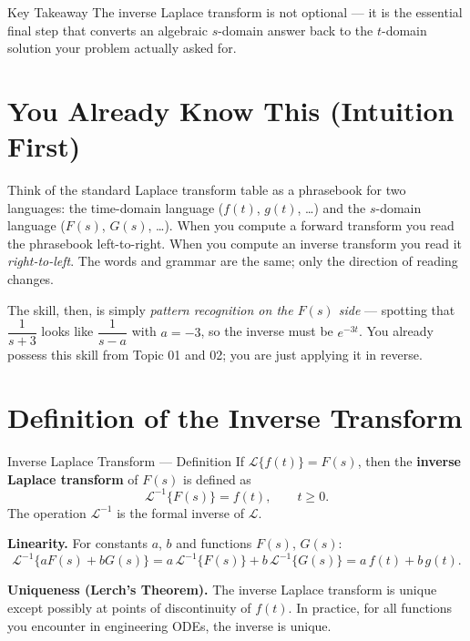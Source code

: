\documentclass[12pt,a4paper]{article}
\begin{document}
\begin{learnbox}{Key Takeaway}
The inverse Laplace transform is not optional --- it is the essential final step
that converts an algebraic $s$-domain answer back to the $t$-domain solution your
problem actually asked for.
\end{learnbox}

\section{You Already Know This (Intuition First)}

Think of the standard Laplace transform table as a phrasebook for two languages:
the time-domain language ($f(t)$, $g(t)$, \ldots) and the $s$-domain language
($F(s)$, $G(s)$, \ldots).  When you compute a forward transform you read the
phrasebook left-to-right.  When you compute an inverse transform you read it
\emph{right-to-left}.  The words and grammar are the same; only the direction
of reading changes.

The skill, then, is simply \emph{pattern recognition on the $F(s)$ side} ---
spotting that $\dfrac{1}{s+3}$ looks like $\dfrac{1}{s-a}$ with $a=-3$, so
the inverse must be $e^{-3t}$.  You already possess this skill from Topic 01
and 02; you are just applying it in reverse.

\section{Definition of the Inverse Transform}

\begin{infobox}{Inverse Laplace Transform --- Definition}
If $\mathcal{L}\{f(t)\} = F(s)$, then the \textbf{inverse Laplace transform} of
$F(s)$ is defined as
\[
    \mathcal{L}^{-1}\{F(s)\} = f(t), \qquad t \geq 0.
\]
The operation $\mathcal{L}^{-1}$ is the formal inverse of $\mathcal{L}$.

\medskip\noindent\textbf{Linearity.}
For constants $a$, $b$ and functions $F(s)$, $G(s)$:
\[
    \mathcal{L}^{-1}\{aF(s) + bG(s)\} = a\,\mathcal{L}^{-1}\{F(s)\} + b\,\mathcal{L}^{-1}\{G(s)\}
    = a\,f(t) + b\,g(t).
\]

\medskip\noindent\textbf{Uniqueness (Lerch's Theorem).}
The inverse Laplace transform is unique except possibly at points of
discontinuity of $f(t)$.  In practice, for all functions you encounter in
engineering ODEs, the inverse is unique.
\end{infobox}
\end{document}
